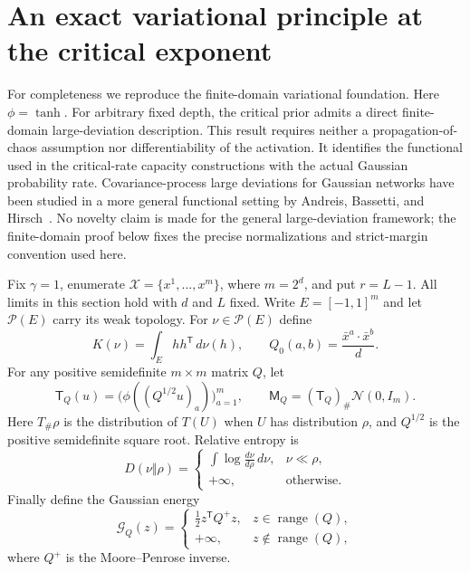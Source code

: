 \section{An exact variational principle at the critical exponent}
\label{sec:critical-variational}

For completeness we reproduce the finite-domain variational foundation.
Here $\phi=\tanh$. For arbitrary fixed depth, the critical prior admits a direct finite-domain
large-deviation description. This result requires neither a propagation-of-chaos
assumption nor differentiability of the activation. It identifies the functional used in the critical-rate capacity constructions
with the actual Gaussian probability rate.
Covariance-process large deviations for Gaussian networks have been studied
in a more general functional setting by Andreis, Bassetti, and
Hirsch~\cite{andreis2026}. No novelty claim is made for the general
large-deviation framework; the finite-domain proof below fixes the precise
normalizations and strict-margin convention used here.

Fix $\gamma=1$, enumerate $\mathcal X=\{x^1,\ldots,x^m\}$, where $m=2^d$,
and put $r=L-1$. All limits in this section hold with $d$ and $L$ fixed.
Write $E=[-1,1]^m$ and let $\mathcal P(E)$ carry its weak topology.
For $\nu\in\mathcal P(E)$ define
\[
 K(\nu)=\int_E hh^{\mathsf T}\,d\nu(h),\qquad
 Q_0(a,b)=\frac{\bar x^a\cdot\bar x^b}{d}.
\]
For any positive semidefinite $m\times m$ matrix $Q$, let
\[
 \mathsf T_Q(u)=\bigl(\phi((Q^{1/2}u)_a)\bigr)_{a=1}^m,
 \qquad
 \mathsf M_Q=(\mathsf T_Q)_\#\mathcal N(0,I_m).
\]
Here $T_\#\rho$ is the distribution of $T(U)$ when $U$ has distribution $\rho$,
and $Q^{1/2}$ is the positive semidefinite square root. Relative entropy is
\[
 D(\nu\Vert\rho)=
 \begin{cases}
 \displaystyle\int\log\frac{d\nu}{d\rho}\,d\nu,&\nu\ll\rho,\\
 +\infty,&\text{otherwise}.
 \end{cases}
\]
Finally define the Gaussian energy
\[
 \mathcal G_Q(z)=
 \begin{cases}
 \frac12 z^{\mathsf T}Q^+z,&z\in\operatorname{range}(Q),\\
 +\infty,&z\notin\operatorname{range}(Q),
 \end{cases}
\]
where $Q^+$ is the Moore--Penrose inverse.

